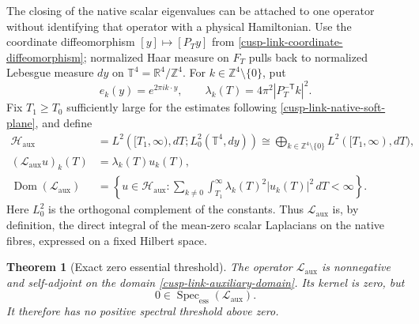 \documentclass[11pt]{article}
\newtheorem{theorem}{Theorem}[section]
\theoremstyle{definition}
\numberwithin{equation}{section}
\begin{document}
The closing of the native scalar eigenvalues can be attached to one operator
without identifying that operator with a physical Hamiltonian.  Use the
coordinate diffeomorphism \([y]\mapsto[P_Ty]\) from
\eqref{cusp-link-coordinate-diffeomorphism}; normalized Haar measure on
\(F_T\) pulls back to normalized Lebesgue measure \(dy\) on
\(\mathbb T^4=\mathbb R^4/\mathbb Z^4\).  For
\(k\in\mathbb Z^4\setminus\{0\}\), put
\[
 e_k(y)=e^{2\pi i k\cdot y},
 \qquad
 \lambda_k(T)=4\pi^2|P_T^{-\mathsf T}k|^2.
\]
Fix \(T_1\ge T_0\) sufficiently large for the estimates following
\eqref{cusp-link-native-soft-plane}, and define
\begin{align}
 \mathscr H_{\mathrm{aux}}
 &=L^2\!\left([T_1,\infty),dT;
       L^2_0(\mathbb T^4,dy)\right)
 \cong\bigoplus_{k\in\mathbb Z^4\setminus\{0\}}
       L^2([T_1,\infty),dT),
 \label{cusp-link-auxiliary-Hilbert-space}\\
 (\mathscr L_{\mathrm{aux}}u)_k(T)
 &=\lambda_k(T)u_k(T),
 \label{cusp-link-auxiliary-operator}\\
 \operatorname{Dom}(\mathscr L_{\mathrm{aux}})
 &=\left\{u\in\mathscr H_{\mathrm{aux}}:
   \sum_{k\ne0}\int_{T_1}^{\infty}
   \lambda_k(T)^2|u_k(T)|^2\,dT<\infty\right\}.
 \label{cusp-link-auxiliary-domain}
\end{align}
Here \(L^2_0\) is the orthogonal complement of the constants.  Thus
\(\mathscr L_{\mathrm{aux}}\) is, by definition, the direct integral of the
mean-zero scalar Laplacians on the native fibres, expressed on a fixed
Hilbert space.

\begin{theorem}[Exact zero essential threshold]
\label{cusp-link-auxiliary-gapless-theorem}
The operator \(\mathscr L_{\mathrm{aux}}\) is nonnegative and self-adjoint on
the domain \eqref{cusp-link-auxiliary-domain}.  Its kernel is zero, but
\begin{equation}
 0\in\operatorname{Spec}_{\mathrm{ess}}(\mathscr L_{\mathrm{aux}}).
 \label{cusp-link-auxiliary-essential-zero}
\end{equation}
It therefore has no positive spectral threshold above zero.
\end{theorem}
\end{document}
